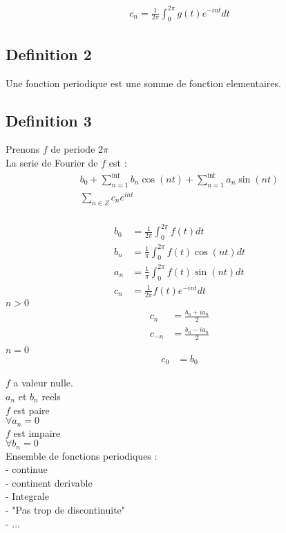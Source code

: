 \documentclass[a4paper,11pt]{article}
\begin{document}
\begin{align*}
  c_n = \frac{1}{2\pi} \int_0^{2\pi} g(t) e^{-int} dt
\end{align*}
\subsection{Definition 2}
Une fonction periodique est une somme de fonction elementaires.

\newpage
\subsection{Definition 3}
Prenons $f$ de periode $2\pi$\\
La serie de Fourier de $f$ est :\\

\begin{align*}
b_0 + \sum_{n = 1 }^{\inf} b_n  \cos(nt) + \sum_{n = 1}^{\inf} a_n \sin(nt)\\
\sum_{n \in Z} c_n e^{int}\\
\end{align*}

\begin{align*}
  b_0 &= \frac{1}{2\pi} \int_{0}^{2\pi} f(t) dt\\
  b_n &= \frac{1}{\pi} \int_{0}^{2\pi} f(t) \cos(nt)dt\\
  a_n &= \frac{1}{\pi} \int_0^{2\pi} f(t)\sin(nt) dt\\
  c_n &= \frac{1}{2\pi} f(t) e^{-int} dt
\end{align*}
$n > 0$ \\
\begin{align*}
  c_n &= \frac{b_n + i a_n}{2}\\
   c_{-n} &= \frac{b_n - i a_n}{2}\\
  \end{align*}
   $n = 0$\\
  \begin{align*}
 c_0 &= b_0
\end{align*}

$f$ a valeur nulle.\\
$a_n$ et $b_n$ reels\\

$f$ est paire\\
$ \forall a_n = 0$\\
$f$ est impaire\\
$\forall b_n = 0$\\

Ensemble de fonctions periodiques :\\
- continue\\
- continent derivable\\
- Integrale\\
- "Pas trop de  discontinuite"\\
- ...\\
\end{document}
